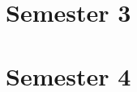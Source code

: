 \documentclass[a4paper,11pt]{scrreprt}
\begin{document}


\makeatletter
\let\partbackup\l@part
\renewcommand*\l@part[2]{\partbackup{#1}{}}



% 
% 
% 

\newpage



\newpage
\pagestyle{fancy}
\tableofcontents

\newpage

\pagestyle{fancy}


\newpage
\part{Semester 3} %
\label{prt:semester3}







\part{Semester 4} %
\label{prt:semester4}



% 
% 
\newpage
\listoffigures

\newpage


\end{document}
